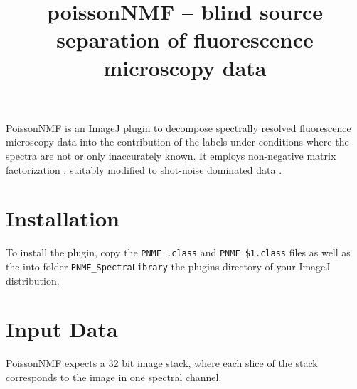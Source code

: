 \documentclass{article}
\title{poissonNMF -- blind source separation of fluorescence microscopy data}
\begin{document}
\maketitle
PoissonNMF is an ImageJ plugin to decompose spectrally resolved fluorescence
microscopy data into the contribution of the labels under conditions where the
spectra are not or only inaccurately known. It employs non-negative matrix
factorization \cite{Lee_Nature_99}, suitably modified to shot-noise dominated
data \cite{Neher_BPJ_2009}. 

\section*{Installation}
To install the plugin, copy the \texttt{PNMF\_.class} and 
\texttt{PNMF\_\$1.class} files as well as the into folder
\texttt{PNMF\_SpectraLibrary} the plugins directory of your ImageJ
distribution. 

\section*{Input Data} PoissonNMF expects a 32 bit image stack, where each 
slice of the stack corresponds to the image in one spectral channel. 
\end{document}
